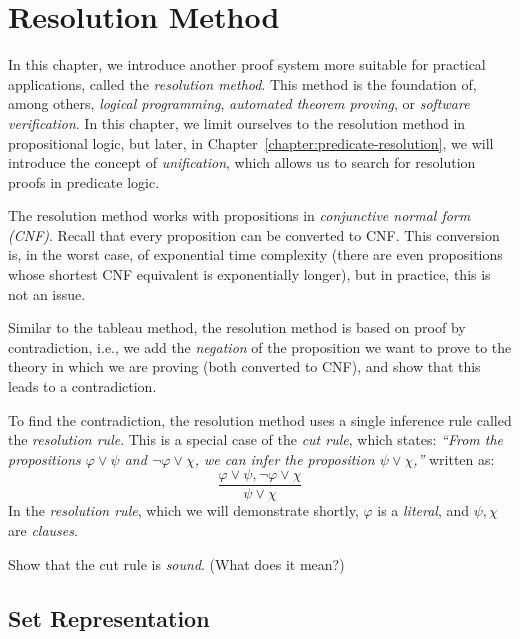 \chapter{Resolution Method}\label{chapter:propositional-resolution}

In this chapter, we introduce another proof system more suitable for practical applications, called the \emph{resolution method}. This method is the foundation of, among others, \emph{logical programming}, \emph{automated theorem proving}, or \emph{software verification}. In this chapter, we limit ourselves to the resolution method in propositional logic, but later, in Chapter~\ref{chapter:predicate-resolution}, we will introduce the concept of \emph{unification}, which allows us to search for resolution proofs in predicate logic.

The resolution method works with propositions in \emph{conjunctive normal form (CNF)}. Recall that every proposition can be converted to CNF. This conversion is, in the worst case, of exponential time complexity (there are even propositions whose shortest CNF equivalent is exponentially longer), but in practice, this is not an issue.

Similar to the tableau method, the resolution method is based on proof by contradiction, i.e., we add the \emph{negation} of the proposition we want to prove to the theory in which we are proving (both converted to CNF), and show that this leads to a contradiction.

To find the contradiction, the resolution method uses a single inference rule called the \emph{resolution rule}. This is a special case of the \emph{cut rule}, which states: \emph{``From the propositions $\varphi \lor \psi$ and $\neg \varphi \lor \chi$, we can infer the proposition $\psi \lor \chi$,''} written as:
$$
\frac{\varphi \lor \psi, \neg \varphi \lor \chi}{\psi \lor \chi}
$$
In the \emph{resolution rule}, which we will demonstrate shortly, $\varphi$ is a \emph{literal}, and $\psi, \chi$ are \emph{clauses}.

\begin{exercise}
Show that the cut rule is \emph{sound}. (What does it mean?)
\end{exercise}

\section{Set Representation}

